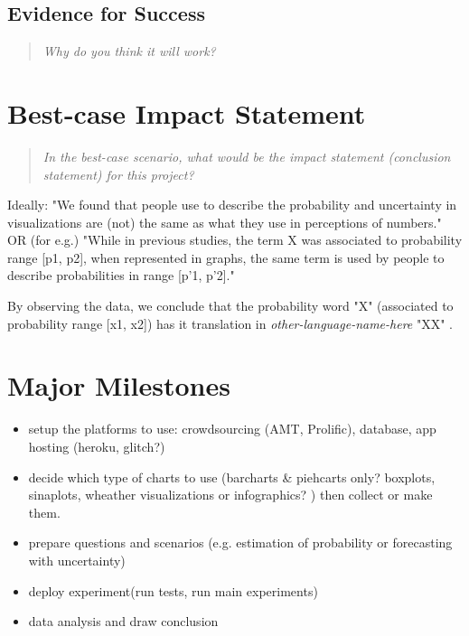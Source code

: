 \documentclass{proc}
\begin{document}
\subsection{Evidence for Success}
\begin{quote}
\textit{Why do you think it will work?} 

\end{quote}

\section{Best-case Impact Statement}
\begin{quote}
\textit{In the best-case scenario, what would be the impact statement (conclusion statement) for this project?}
\end{quote}
Ideally: "We found that people use to describe the probability and uncertainty in visualizations are (not) the same as what they use in perceptions of numbers." OR (for e.g.) "While in previous studies, the term X was associated to probability range [p1, p2], when represented in graphs, the same term is used by people to describe probabilities in range [p'1, p'2]."

By observing the data, we conclude that the probability word "X" (associated to probability range [x1, x2]) has it translation in \textit{other-language-name-here} "XX" .

\section{Major Milestones}

\begin{itemize}
    \item setup the platforms to use: crowdsourcing (AMT, Prolific), database, app hosting (heroku, glitch?) 
    \item decide which type of charts to use (barcharts \& piehcarts only? boxplots, sinaplots, wheather visualizations or infographics? ) then collect or make them.
    
    \item prepare questions and scenarios (e.g. estimation of probability or  forecasting with uncertainty)
	\item deploy experiment(run tests, run main experiments)
	\item data analysis and draw conclusion
\end{itemize}
\end{document}
